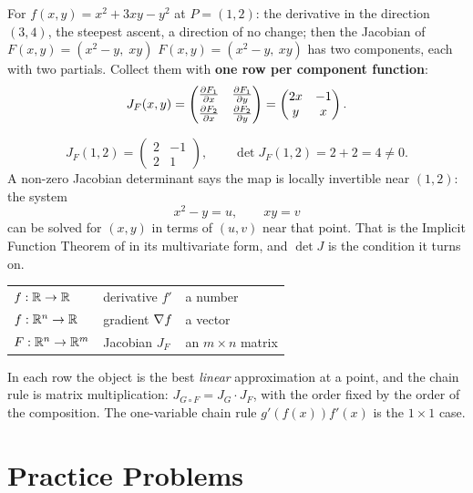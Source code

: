 \begin{worked}{For $f(x,y)=x^{2}+3xy-y^{2}$ at $P=(1,2)$: the derivative in the direction $(3,4)$, the steepest ascent, a direction of no change; then the Jacobian of $F(x,y)=(x^{2}-y,\;xy)$}
$F(x,y)=(x^{2}-y,\ xy)$ has two components, each with two partials. Collect
them with \textbf{one row per component function}:
\[
  J_{F}(x,y)=
  \begin{pmatrix}
    \frac{\partial F_{1}}{\partial x} & \frac{\partial F_{1}}{\partial y}\\[0.6ex]
    \frac{\partial F_{2}}{\partial x} & \frac{\partial F_{2}}{\partial y}
  \end{pmatrix}
  =\begin{pmatrix}2x&-1\\ y&x\end{pmatrix}.
\]

\[
  J_{F}(1,2)=\begin{pmatrix}2&-1\\2&1\end{pmatrix},
  \qquad
  \det J_{F}(1,2)=2+2=4\neq0 .
\]
A non-zero Jacobian determinant says the map is locally invertible near
$(1,2)$: the system
\[
  x^{2}-y=u,\qquad xy=v
\]
can be solved for $(x,y)$ in terms of $(u,v)$ near that point. That is the
Implicit Function Theorem of  in its multivariate form, and
$\det J$ is the condition it turns on.

\begin{center}\footnotesize
\begin{tabular}{lll}
  \hline
  $f:\mathbb{R}\to\mathbb{R}$ & derivative $f'$ & a number\\
  $f:\mathbb{R}^{n}\to\mathbb{R}$ & gradient $\nabla f$ & a vector\\
  $F:\mathbb{R}^{n}\to\mathbb{R}^{m}$ & Jacobian $J_{F}$ & an $m\times n$ matrix\\
  \hline
\end{tabular}
\end{center}
In each row the object is the best \emph{linear} approximation at a point,
and the chain rule is matrix multiplication:
$J_{G\circ F}=J_{G}\cdot J_{F}$, with the order fixed by the order of the
composition. The one-variable chain rule $g'(f(x))f'(x)$ is the
$1\times1$ case.
\end{worked}

\section{Practice Problems}

